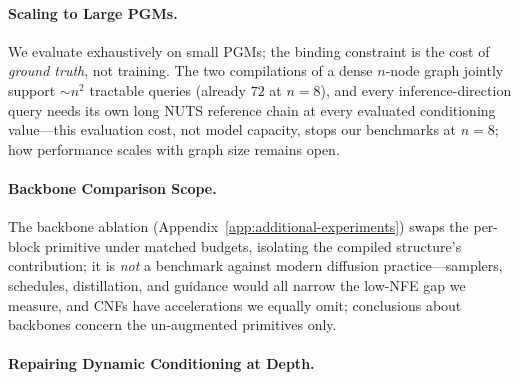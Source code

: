 \paragraph{Scaling to Large PGMs.}
We evaluate exhaustively on small PGMs; the binding constraint is the cost of \emph{ground truth}, not training. The two compilations of a dense $n$-node graph jointly support ${\sim}n^2$ tractable queries (already $72$ at $n{=}8$), and every inference-direction query needs its own long NUTS reference chain at every evaluated conditioning value---this evaluation cost, not model capacity, stops our benchmarks at $n = 8$; how performance scales with graph size remains open.

\paragraph{Backbone Comparison Scope.}
The backbone ablation (Appendix~\ref{app:additional-experiments}) swaps the per-block primitive under matched budgets, isolating the compiled structure's contribution; it is \emph{not} a benchmark against modern diffusion practice---samplers, schedules, distillation, and guidance would all narrow the low-NFE gap we measure, and CNFs have accelerations we equally omit; conclusions about backbones concern the un-augmented primitives only.

\paragraph{Repairing Dynamic Conditioning at Depth.}
